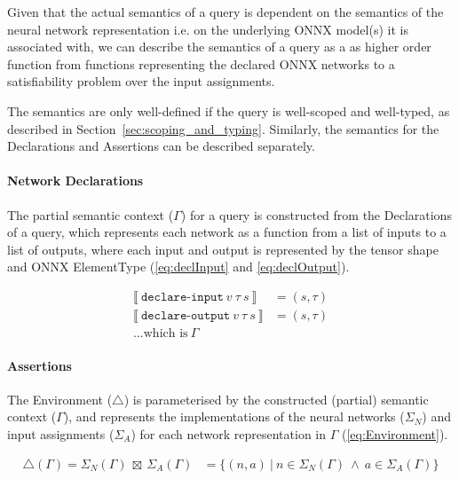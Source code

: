 Given that the actual semantics of a \vnnlib{} query is dependent on the semantics of the neural network representation i.e. on the underlying ONNX model(s) it is associated with, we can describe the semantics of a query as a as higher order function from functions representing the declared ONNX networks to a satisfiability problem over the input assignments. 

The semantics are only well-defined if the query is well-scoped and well-typed, as described in Section~\ref{sec:scoping_and_typing}. Similarly, the semantics for the Declarations and Assertions can be described separately.


\paragraph{Network Declarations}
The partial semantic context ($\Gamma$) for a \vnnlib{} query is constructed from the Declarations of a \vnnlib{} query, which represents each network as a function from a list of inputs to a list of outputs, where each input and output is represented by the tensor shape and ONNX ElementType (\autoref{eq:declInput} and \autoref{eq:declOutput}).

\begin{align}
    \llbracket~\texttt{declare-input}~v~\tau~s~\rrbracket &= (s, \tau) \label{eq:declInput}\\
    \llbracket~\texttt{declare-output}~v~\tau~s~\rrbracket &= (s, \tau) \label{eq:declOutput} \\
    ... \text{which is}~\Gamma 
\end{align}


\paragraph{Assertions}
The Environment ($\triangle$) is parameterised by the constructed (partial) semantic context ($\Gamma$), and represents the implementations of the neural networks ($\Sigma_N$) and input assignments ($\Sigma_A$) for each network representation in $\Gamma$ (\autoref{eq:Environment}).

\begin{align} \label{eq:Environment}
    \triangle (\Gamma) = \Sigma_N(\Gamma)~\boxtimes~\Sigma_A(\Gamma) &= \{(n, a)~|~n \in \Sigma_N(\Gamma)~\land~a \in \Sigma_A(\Gamma)\}
\end{align}

